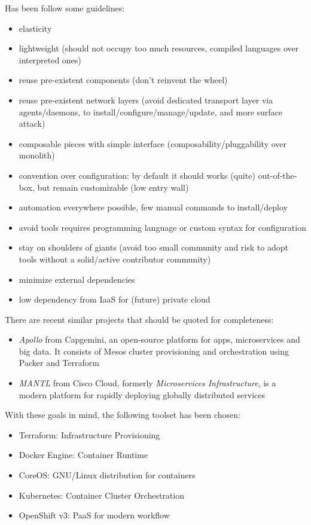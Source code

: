 Has been follow some guidelines:

\begin{itemize}
\item elasticity
\item lightweight (should not occupy too much resources, compiled languages
  over interpreted ones)
\item reuse pre-existent components (don't reinvent the wheel)
\item reuse pre-existent network layers (avoid dedicated transport layer via
  agents/daemons, to install/configure/manage/update, and more surface
  attack)
\item composable pieces with simple interface (composability/pluggability
  over monolith)
\item convention over configuration: by default it should works (quite)
  out-of-the-box, but remain customizable (low entry wall)
\item automation everywhere possible, few manual commands to install/deploy
\item avoid tools requires programming language or custom syntax for
  configuration
\item stay on shoulders of giants (avoid too small community and risk to
  adopt tools without a solid/active contributor community)
\item minimize external dependencies
\item low dependency from IaaS for (future) private cloud
\end{itemize}

There are recent similar projects that should be quoted for
completeness:

\begin{itemize}
\item \textit{Apollo}\cite{Apollo} from Capgemini, an open-source platform for
  apps, microservices and big data. It consists of Mesos cluster
  provisioning and orchestration using Packer and Terraform
\item \textit{MANTL}\cite{MANTL} from Cisco Cloud, formerly
  \textit{Microservices Infrastructure}, is a modern platform for rapidly
  deploying globally distributed services
\end{itemize}

With these goals in mind, the following toolset has been chosen:
\begin{itemize}
\item Terraform: Infrastructure Provisioning
\item Docker Engine: Container Runtime
\item CoreOS: GNU/Linux distribution for containers
\item Kubernetes: Container Cluster Orchestration
\item OpenShift v3: PaaS for modern workflow
\end{itemize}


